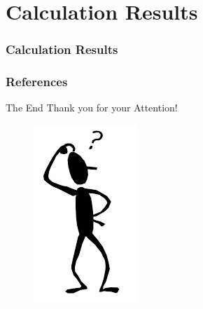 \documentclass[hyperref={pdfpagelabels=false}]{beamer}
\begin{document}
\section{Calculation Results}
\begin{frame}
\frametitle{Calculation Results}
\centering

\end{frame}

\begin{frame}[allowframebreaks]
	\frametitle{References}
	\nocite{KernelBasedObjectTracking}
	
	
\end{frame}

\begin{frame}{The End}
\centering
\LARGE
\color{red}
 Thank you for your Attention!
 \nocite{BeamerTheme}
\end{frame}

\begin{frame}
\centering
\begin{figure}
	\includegraphics{images/who.png}
\end{figure}
\end{frame}
\end{document}
